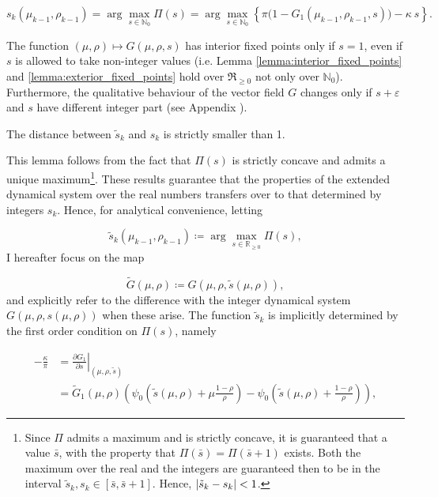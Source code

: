 \documentclass[../../main.tex]{subfiles}
\begin{document}
\begin{equation} \label{eq:firm_problem}
  s_k(\mu_{k - 1}, \rho_{k - 1}) = \arg\max_{s \in \mathbb{N}_0} \Pi(s) = \arg\max_{s \in \mathbb{N}_0} \left\{ \pi \Big(1 - G_1(\mu_{k - 1}, \rho_{k - 1}, s)\Big) - \kappa \  s \right\}.
\end{equation}



The function $(\mu, \rho) \mapsto G(\mu, \rho, s)$ has interior fixed points only if $s = 1$, even if $s$ is allowed to take non-integer values (i.e. Lemma \ref{lemma:interior_fixed_points} and \ref{lemma:exterior_fixed_points} hold over $\Re_{\geq 0}$ not only over $\mathbb{N}_0$). Furthermore, the qualitative behaviour of the vector field $G$ changes only if $s + \varepsilon$ and $s$ have different integer part (see Appendix ). 

\begin{lemma}
  The distance between $\tilde{s}_k$ and $s_k$ is strictly smaller than 1.
\end{lemma}

This lemma follows from the fact that $\Pi(s)$ is strictly concave and admits a unique maximum\footnote{Since $\Pi$ admits a maximum and is strictly concave, it is guaranteed that a value $\bar{s}$, with the property that $\Pi(\bar{s}) = \Pi(\bar{s} + 1)$ exists. Both the maximum over the real and the integers are guaranteed then to be in the interval $\tilde{s}_k, s_k \in [\bar{s}, \bar{s} + 1]$. Hence, $\left\lvert\tilde{s}_k - s_k\right\rvert < 1$.}. These results guarantee that the properties of the extended dynamical system over the real numbers transfers over to that determined by integers $s_k$. Hence, for analytical convenience, letting

\begin{equation}
  \tilde{s}_k(\mu_{k - 1}, \rho_{k - 1}) \coloneqq \arg\max_{s \in \mathbb{R}_{\geq 0}} \Pi(s),
\end{equation} I hereafter focus on the map

\begin{equation}
  \tilde{G}(\mu, \rho) \coloneqq G(\mu, \rho, \tilde{s}(\mu, \rho)),
\end{equation} and explicitly refer to the difference with the integer dynamical system $G(\mu, \rho, s(\mu, \rho))$ when these arise. The function $\tilde{s}_k$ is implicitly determined by the first order condition on $\Pi(s)$, namely

\begin{equation} \label{eq:exact-foc}
  \begin{split}
    -\frac{\kappa}{\pi} &= \left. \frac{\partial G_1}{\partial s} \right\vert_{(\mu, \rho, \tilde{s})}  \\
    &= \tilde{G}_1(\mu, \rho) \left(\psi_0\left(\tilde{s}(\mu, \rho) + \mu \frac{1 - \rho}{\rho} \right) - \psi_0\left(\tilde{s}(\mu, \rho) + \frac{1 - \rho}{\rho} \right)  \right),
  \end{split}
\end{equation}
\end{document}
